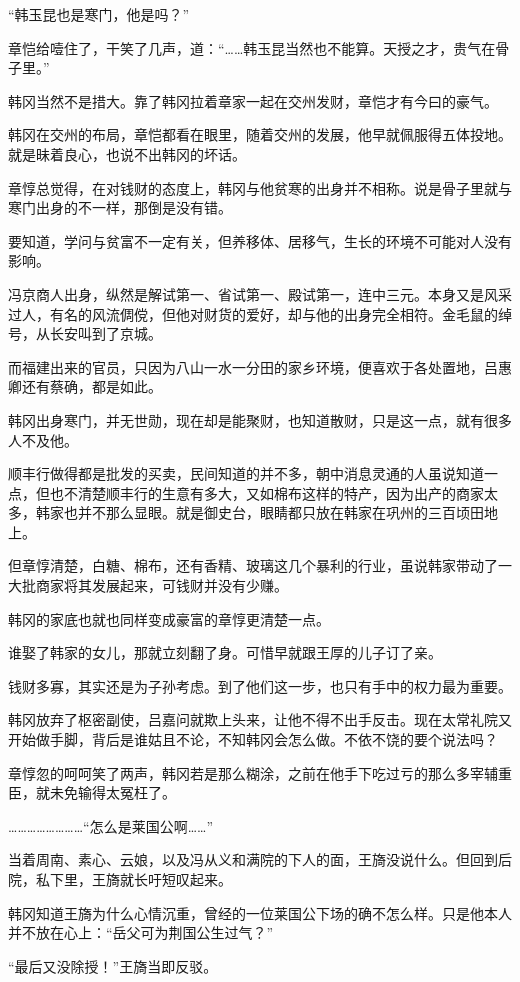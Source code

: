 “韩玉昆也是寒门，他是吗？”

章恺给噎住了，干笑了几声，道：“……韩玉昆当然也不能算。天授之才，贵气在骨子里。”

韩冈当然不是措大。靠了韩冈拉着章家一起在交州发财，章恺才有今曰的豪气。

韩冈在交州的布局，章恺都看在眼里，随着交州的发展，他早就佩服得五体投地。就是昧着良心，也说不出韩冈的坏话。

章惇总觉得，在对钱财的态度上，韩冈与他贫寒的出身并不相称。说是骨子里就与寒门出身的不一样，那倒是没有错。

要知道，学问与贫富不一定有关，但养移体、居移气，生长的环境不可能对人没有影响。

冯京商人出身，纵然是解试第一、省试第一、殿试第一，连中三元。本身又是风采过人，有名的风流倜傥，但他对财货的爱好，却与他的出身完全相符。金毛鼠的绰号，从长安叫到了京城。

而福建出来的官员，只因为八山一水一分田的家乡环境，便喜欢于各处置地，吕惠卿还有蔡确，都是如此。

韩冈出身寒门，并无世勋，现在却是能聚财，也知道散财，只是这一点，就有很多人不及他。

顺丰行做得都是批发的买卖，民间知道的并不多，朝中消息灵通的人虽说知道一点，但也不清楚顺丰行的生意有多大，又如棉布这样的特产，因为出产的商家太多，韩家也并不那么显眼。就是御史台，眼睛都只放在韩家在巩州的三百顷田地上。

但章惇清楚，白糖、棉布，还有香精、玻璃这几个暴利的行业，虽说韩家带动了一大批商家将其发展起来，可钱财并没有少赚。

韩冈的家底也就也同样变成豪富的章惇更清楚一点。

谁娶了韩家的女儿，那就立刻翻了身。可惜早就跟王厚的儿子订了亲。

钱财多寡，其实还是为子孙考虑。到了他们这一步，也只有手中的权力最为重要。

韩冈放弃了枢密副使，吕嘉问就欺上头来，让他不得不出手反击。现在太常礼院又开始做手脚，背后是谁姑且不论，不知韩冈会怎么做。不依不饶的要个说法吗？

章惇忽的呵呵笑了两声，韩冈若是那么糊涂，之前在他手下吃过亏的那么多宰辅重臣，就未免输得太冤枉了。

……………………“怎么是莱国公啊……”

当着周南、素心、云娘，以及冯从义和满院的下人的面，王旖没说什么。但回到后院，私下里，王旖就长吁短叹起来。

韩冈知道王旖为什么心情沉重，曾经的一位莱国公下场的确不怎么样。只是他本人并不放在心上：“岳父可为荆国公生过气？”

“最后又没除授！”王旖当即反驳。

